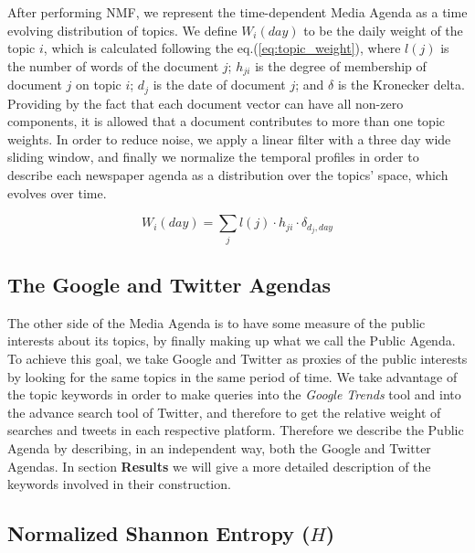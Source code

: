 \documentclass{bmcart}
\begin{document}
\par After performing NMF, we represent the time-dependent Media Agenda as a time evolving distribution of topics. We define $W_i(day)$ to be the daily weight of the topic $i$, which is calculated following the eq.(\ref{eq:topic_weight}), where $l(j)$ is the number of words of the document $j$; $h_{ji}$ is the degree of membership of document $j$ on topic $i$; $d_j$ is the date of document $j$; and $\delta$ is the Kronecker delta. 
Providing by the fact that each document vector can have all non-zero components, it is allowed that a document contributes to more than one topic weights.
In order to reduce noise, we apply a linear filter with a three day wide sliding window, and finally we normalize the temporal profiles in order to describe each newspaper agenda as a distribution over the topics' space, which evolves over time. 

\begin{equation}
W_i(day) = \sum_j l(j) \cdot h_{ji} \cdot \delta_{d_j,day}
\label{eq:topic_weight}
\end{equation}

\subsection*{The Google and Twitter Agendas}
 
\par The other side of the Media Agenda is to have some measure of the public interests about its topics, by finally making up what we call the Public Agenda. 
To achieve this goal, we take Google and Twitter as proxies of the public interests by looking for the same topics in the same period of time. We take advantage of the topic keywords in order to make queries into the \emph{Google Trends} tool and into the advance search tool of Twitter, and therefore to get the relative weight of searches and tweets in each respective platform. 
Therefore we describe the Public Agenda by describing, in an independent way, both the Google and Twitter Agendas. 
In section \textbf{Results} we will give a more detailed description of the keywords involved in their construction.

\subsection*{Normalized Shannon Entropy ($H$)}
\end{document}
